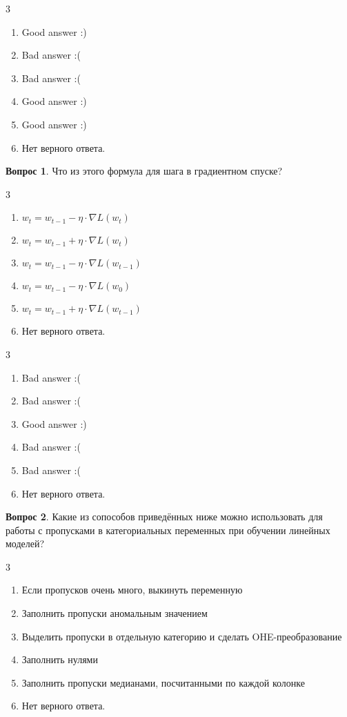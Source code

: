 \documentclass[12pt]{article}
\newenvironment{answerlist}[1][3]{
\begin{multicols}{#1}

\begin{enumerate}[label=\fbox{\emph{\Alph*}},ref=\emph{\alph*}]
}
{
\item Нет верного ответа.
\end{enumerate}
\end{multicols}
}
\theoremstyle{definition}
\newtheorem{question}{Вопрос}
\begin{document}
\begin{solution}
\begin{answerlist}
  \item Good answer :)
  \item Bad answer :(
  \item Bad answer :(
  \item Good answer :)
  \item Good answer :)
\end{answerlist}
\end{solution}



\begin{question}
Что из этого формула для шага в градиентном спуске? 
\begin{answerlist}
  \item \(w_t = w_{t-1} - \eta \cdot \nabla L(w_{t})\) 
  \item \(w_t = w_{t-1} + \eta \cdot \nabla L(w_{t})\)
  \item \(w_t = w_{t-1} - \eta \cdot \nabla L(w_{t-1})\)
  \item \(w_t = w_{t-1} - \eta \cdot \nabla L(w_{0})\)
  \item \(w_t = w_{t-1} + \eta \cdot \nabla L(w_{t-1})\) 
\end{answerlist}
\end{question}
\begin{solution}
\begin{answerlist}
  \item Bad answer :(
  \item Bad answer :(
  \item Good answer :)
  \item Bad answer :(
  \item Bad answer :(
\end{answerlist}
\end{solution}


\begin{question}
Какие из сопособов приведённых ниже можно использовать для работы с пропусками в категориальных переменных при обучении линейных моделей? 
\begin{answerlist}
   \item Если пропусков очень много, выкинуть переменную 
   \item Заполнить пропуски аномальным значением
   \item Выделить пропуски в отдельную категорию и сделать OHE-преобразование
  \item Заполнить нулями 
  \item Заполнить пропуски медианами, посчитанными по каждой колонке 
\end{answerlist}
\end{question}
\end{document}
